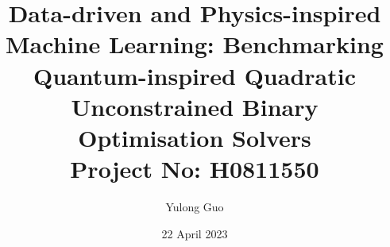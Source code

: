 \documentclass[pdf]{beamer}
\date{22 April 2023}
\title[Data-driven and Physics-inspired Machine Learning: Benchmarking Quantum-inspired Quadratic Unconstrained Binary Optimisation Solvers]{Data-driven and Physics-inspired Machine Learning: Benchmarking Quantum-inspired Quadratic Unconstrained Binary Optimisation Solvers \\ Project No: H0811550}
\author[Yulong Guo \hspace{0.2cm}]{Yulong Guo}
\institute[National University of Singapore]{National University of Singapore}
\begin{document}
\theoremstyle{definition}
\newtheorem{defn}{Definition} \newcommand{\defnautorefname}{Definition}

{ 
\begin{frame}[noframenumbering]
\titlepage
\end{frame}
} %
\end{document}
